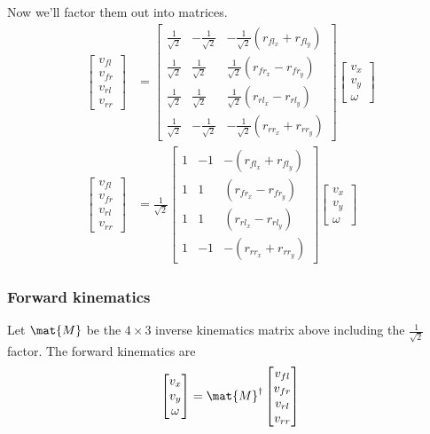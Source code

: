Now we'll factor them out into matrices.
\begin{align}
  \begin{bmatrix}
    v_{fl} \\
    v_{fr} \\
    v_{rl} \\
    v_{rr}
  \end{bmatrix} &=
  \begin{bmatrix}
    \frac{1}{\sqrt{2}} & -\frac{1}{\sqrt{2}} &
      -\frac{1}{\sqrt{2}}(r_{fl_x} + r_{fl_y}) \\
    \frac{1}{\sqrt{2}} &  \frac{1}{\sqrt{2}} &
      \frac{1}{\sqrt{2}}(r_{fr_x} - r_{fr_y}) \\
    \frac{1}{\sqrt{2}} &  \frac{1}{\sqrt{2}} &
      \frac{1}{\sqrt{2}}(r_{rl_x} - r_{rl_y}) \\
    \frac{1}{\sqrt{2}} & -\frac{1}{\sqrt{2}} &
      -\frac{1}{\sqrt{2}}(r_{rr_x} + r_{rr_y})
  \end{bmatrix}
  \begin{bmatrix}
    v_x \\
    v_y \\
    \omega
  \end{bmatrix} \nonumber \\
  \begin{bmatrix}
    v_{fl} \\
    v_{fr} \\
    v_{rl} \\
    v_{rr}
  \end{bmatrix} &= \frac{1}{\sqrt{2}}
  \begin{bmatrix}
    1 & -1  & -(r_{fl_x} + r_{fl_y}) \\
    1 &  1  &  (r_{fr_x} - r_{fr_y}) \\
    1 &  1  &  (r_{rl_x} - r_{rl_y}) \\
    1 & -1  & -(r_{rr_x} + r_{rr_y})
  \end{bmatrix}
  \begin{bmatrix}
    v_x \\
    v_y \\
    \omega
  \end{bmatrix}
\end{align}

\subsubsection{Forward kinematics}

Let $\mat{M}$ be the $4 \times 3$ inverse kinematics matrix above including the
$\frac{1}{\sqrt{2}}$ factor. The forward kinematics are
\begin{equation}
  \begin{bmatrix}
    v_x \\
    v_y \\
    \omega
  \end{bmatrix} =
  \mat{M}^\dagger
  \begin{bmatrix}
    v_{fl} \\
    v_{fr} \\
    v_{rl} \\
    v_{rr}
  \end{bmatrix}
\end{equation}

